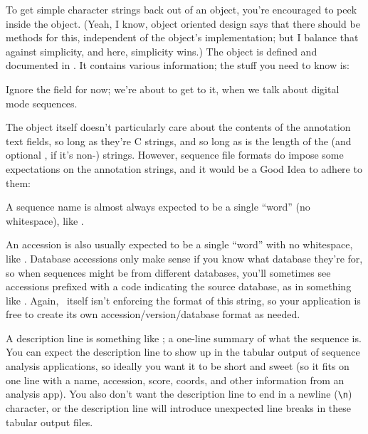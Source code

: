To get simple character strings back out of an  object,
you're encouraged to peek inside the object. (Yeah, I know, object
oriented design says that there should be methods for this,
independent of the object's implementation; but I balance that against
simplicity, and here, simplicity wins.) The object is defined and
documented in . It contains various information; the
stuff you need to know is:



Ignore the  field for now; we're about to get to it, when
we talk about digital mode sequences.

The  object itself doesn't particularly care about the
contents of the annotation text fields, so long as they're C strings, and so
long as  is the length of the  (and optional
, if it's non-) strings. However, sequence file
formats do impose some expectations on the annotation strings, and it
would be a Good Idea to adhere to them:

\begin{sreitems} {}
\item [\emcode{name}] A sequence name is almost always expected to be
  a single ``word'' (no whitespace), like . 

\item [\emcode{acc}] An accession is also usually expected to be a
  single ``word'' with no whitespace, like . Database
  accessions only make sense if you know what database they're for, so
  when sequences might be from different databases, you'll sometimes
  see accessions prefixed with a code indicating the source database,
  as in something like . Again, \Easel\ itself
  isn't enforcing the format of this string, so your application is
  free to create its own accession/version/database format as needed.

\item [\emcode{desc}] A description line is something like ; a one-line summary of what the sequence is. You can expect
the description line to show up in the tabular output of sequence
analysis applications, so ideally you want it to be short and sweet
(so it fits on one line with a name, accession, score, coords, and
other information from an analysis app). You also don't want the
description line to end in a newline (\verb+\n+) character, or the
description line will introduce unexpected line breaks in these
tabular output files.
\end{sreitems}

